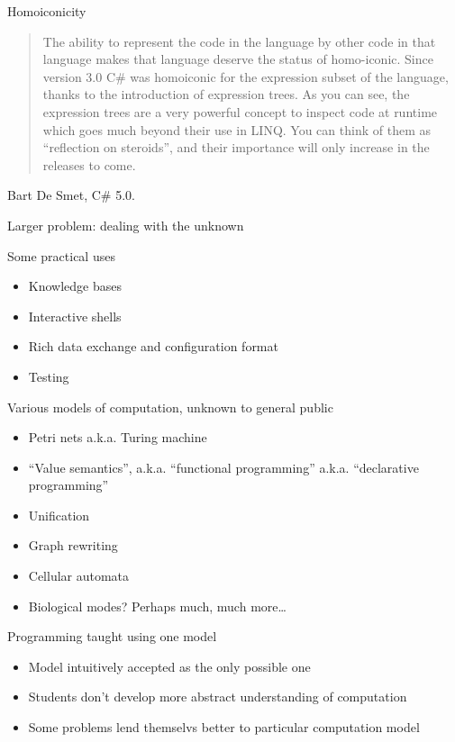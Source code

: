 \documentclass[presentation]{beamer}
\begin{document}
\begin{frame}[label=sec-1-3]{Homoiconicity}
\begin{quote}
The ability to represent the code in the language by other code in
that language makes that language deserve the status of
homo-iconic.  Since version 3.0 C\# was homoiconic for the
expression subset of the language, thanks to the introduction of
expression trees.  As you can see, the expression trees are a very
powerful concept to inspect code at runtime which goes much beyond
their use in LINQ.  You can think of them as ``reflection on
steroids'', and their importance will only increase in the
releases to come.
\end{quote}
Bart De Smet, C\# 5.0.
\end{frame}

\begin{frame}[label=sec-1-4]{Larger problem: dealing with the unknown}
\end{frame}

\begin{frame}[label=sec-1-5]{Some practical uses}
\begin{itemize}
\item Knowledge bases
\item Interactive shells
\item Rich data exchange and configuration format
\item Testing
\end{itemize}
\end{frame}

\begin{frame}[label=sec-1-6]{Various models of computation, unknown to general public}
\begin{itemize}
\item Petri nets a.k.a. Turing machine
\item ``Value semantics'', a.k.a. ``functional programming''
a.k.a. ``declarative programming''
\item Unification
\item Graph rewriting
\item Cellular automata
\item Biological modes? Perhaps much, much more\ldots{}
\end{itemize}
\end{frame}

\begin{frame}[label=sec-1-7]{Programming taught using one model}
\begin{itemize}
\item Model intuitively accepted as the only possible one
\item Students don't develop more abstract understanding of computation
\item Some problems lend themselvs better to particular computation
model
\end{itemize}
\end{frame}
\end{document}

